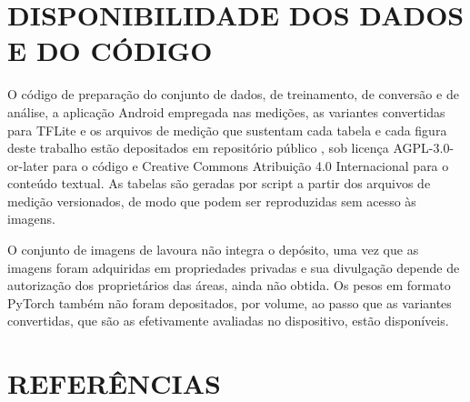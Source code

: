 \documentclass[artigo,times,capa]{iftex2024}
\begin{document}
\section*{DISPONIBILIDADE DOS DADOS E DO CÓDIGO}

O código de preparação do conjunto de dados, de treinamento, de conversão e de análise, a aplicação Android empregada nas medições, as variantes convertidas para \ac{TFLite} e os arquivos de medição que sustentam cada tabela e cada figura deste trabalho estão depositados em repositório público \cite{Assis2026Repositorio}, sob licença AGPL-3.0-or-later para o código e Creative Commons Atribuição 4.0 Internacional para o conteúdo textual. As tabelas são geradas por script a partir dos arquivos de medição versionados, de modo que podem ser reproduzidas sem acesso às imagens.

O conjunto de imagens de lavoura não integra o depósito, uma vez que as imagens foram adquiridas em propriedades privadas e sua divulgação depende de autorização dos proprietários das áreas, ainda não obtida. Os pesos em formato PyTorch também não foram depositados, por volume, ao passo que as variantes convertidas, que são as efetivamente avaliadas no dispositivo, estão disponíveis.

\section*{REFERÊNCIAS}

\printbibliography

\attachment
\end{document}
